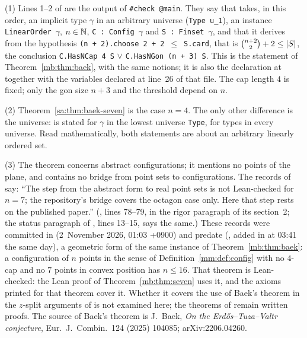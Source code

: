 \begin{remark}\label{sa:rem:baek-seven}
(1) Lines 1--2 of  are the output of \mbox{\texttt{\#check @main}}. They say that 
takes, in this order, an implicit type $\gamma$ in an arbitrary universe (\mbox{\texttt{Type u\_1}}), an instance
\mbox{\texttt{LinearOrder}~$\gamma$}, $n\in\mathbb N$, \mbox{\texttt{C : Config}~$\gamma$} and
\mbox{\texttt{S : Finset}~$\gamma$}, and that it derives from the hypothesis
\mbox{\texttt{(n + 2).choose 2 + 2} $\le$ \texttt{S.card}}, that is $\binom{n+2}{2}+2\le\lvert S\rvert$, the conclusion
\mbox{\texttt{C.HasNCap 4 S}} $\lor$ \mbox{\texttt{C.HasNGon (n + 3) S}}. This is the statement of
Theorem~\ref{mb:thm:baek}, with the same notions; it is also the declaration at
 together with the variables declared at line~26 of that file. The
cap length $4$ is fixed; only the gon size $n+3$ and the threshold depend on $n$.

(2) Theorem~\ref{sa:thm:baek-seven} is the case $n=4$. The only other difference is the universe: 
is stated for $\gamma$ in the lowest universe \texttt{Type},  for types in every universe. Read
mathematically, both statements are about an arbitrary linearly ordered set.

(3) The theorem concerns abstract configurations; it mentions no points of the plane, and
 contains no bridge from point sets to configurations. The records of  say:
``The step from the abstract form to real point sets is not Lean-checked for $n = 7$; the repository's bridge covers
the octagon case only. Here that step rests on the published paper.'' (, lines 78--79, in
the rigor paragraph of its section~2; the status paragraph of , lines 13--15,
says the same.) These records were committed in  (2~November 2026, 01:03 +0900) and predate
 (, added in  at 03:41 the same
day), a geometric form of the same instance of Theorem~\ref{mb:thm:baek}: a configuration of $n$ points in the sense
of Definition~\ref{mm:def:config} with no $4$-cap and no $7$ points in convex position has $n\le16$. That theorem is
Lean-checked: the Lean proof of Theorem~\ref{mb:thm:seven} uses it, and the axioms printed for that theorem cover it.
Whether it covers the use of Baek's theorem in the $z$-split arguments of  is not examined here; the
theorems of  remain written proofs. The source of Baek's theorem is J.~Baek, \emph{On the
Erd\H{o}s--Tuza--Valtr conjecture}, Eur.\ J.\ Combin.\ 124 (2025) 104085; arXiv:2206.04260.
\end{remark}

